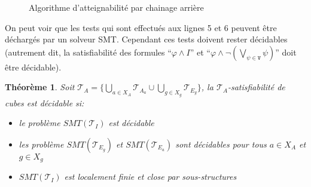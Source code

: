 \documentclass[a4paper, twoside]{scrartcl}
\theoremstyle{plain}%
\newtheorem{thm}{Théorème}[section]
\theoremstyle{definition}
\theoremstyle{remark}
\begin{document}
\begin{figure}[h]\centering
{}

\caption{Algorithme d'atteignabilité par chainage arrière}
\label{br}
\end{figure}


On peut voir que les tests qui sont effectués aux lignes \textsf{5} et
\textsf{6} peuvent être déchargés par un solveur SMT. Cependant ces
tests doivent rester décidables (autrement dit, la satisfiabilité des
formules ``$\varphi \wedge I$'' et ``$\varphi \wedge \neg
(\bigvee_{\psi\in\mathtt{V}} \psi)$'' doit être décidable).


\begin{thm} \label{decidable_cube}
  Soit $\mathcal{T}_A = \{\bigcup_{a \in X_A}\mathcal{T}_{A_a} \cup
  \bigcup_{g \in X_g}\mathcal{T}_{E_g}\}$, la
  $\mathcal{T}_A$-satisfiabilité de cubes est décidable si:
  \begin{itemize}
  \item le problème $SMT(\mathcal{T}_I)$ est décidable
  \item les problème $SMT(\mathcal{T}_{E_g})$ et
    $SMT(\mathcal{T}_{E_a})$ sont décidables pour tous $a \in X_A$ et $g \in X_g$
  \item $SMT(\mathcal{T}_I)$ est localement finie et close par sous-structures
  \end{itemize}
\end{thm}
\end{document}
